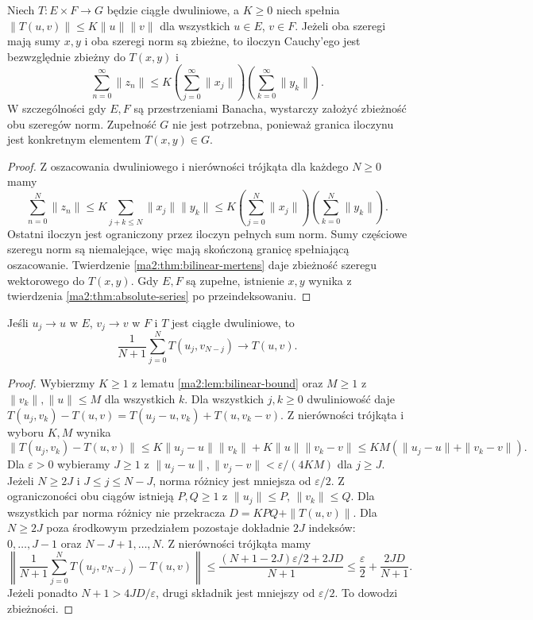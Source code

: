 \begin{wniosek}
\label{ma2:cor:bilinear-absolute}
Niech $T:E\times F\to G$ będzie ciągłe dwuliniowe,
a $K\ge0$ niech spełnia $\|T(u,v)\|\le K\|u\|\|v\|$
dla wszystkich $u\in E$, $v\in F$. Jeżeli oba szeregi
mają sumy $x,y$ i oba szeregi norm są zbieżne, to iloczyn Cauchy'ego
jest bezwzględnie zbieżny do $T(x,y)$ i
\[
 \sum_{n=0}^{\infty}\|z_n\|
 \le K\left(\sum_{j=0}^\infty\|x_j\|\right)
      \left(\sum_{k=0}^\infty\|y_k\|\right).
\]
W szczególności gdy $E,F$ są przestrzeniami Banacha,
wystarczy założyć zbieżność obu szeregów norm.
Zupełność $G$ nie jest potrzebna, ponieważ granica
iloczynu jest konkretnym elementem $T(x,y)\in G$.
\end{wniosek}
\begin{proof}
Z oszacowania dwuliniowego i nierówności trójkąta
dla każdego $N\ge0$ mamy
\[
 \sum_{n=0}^N\|z_n\|
 \le K\sum_{j+k\le N}\|x_j\|\|y_k\|
 \le K\left(\sum_{j=0}^N\|x_j\|\right)
      \left(\sum_{k=0}^N\|y_k\|\right).
\]
Ostatni iloczyn jest ograniczony przez iloczyn pełnych
sum norm. Sumy częściowe szeregu norm są niemalejące,
więc mają skończoną granicę spełniającą oszacowanie.
Twierdzenie \ref{ma2:thm:bilinear-mertens} daje
zbieżność szeregu wektorowego do $T(x,y)$.
Gdy $E,F$ są zupełne, istnienie $x,y$ wynika
z twierdzenia \ref{ma2:thm:absolute-series} po przeindeksowaniu.
\end{proof}

\begin{lemat}
\label{ma2:lem:bilinear-diagonal-means}
Jeśli $u_j\to u$ w $E$, $v_j\to v$ w $F$ i $T$ jest
ciągłe dwuliniowe, to
\[
 \frac1{N+1}\sum_{j=0}^N T(u_j,v_{N-j})\longrightarrow T(u,v).
\]
\end{lemat}
\begin{proof}
Wybierzmy $K\ge1$ z lematu \ref{ma2:lem:bilinear-bound}
oraz $M\ge1$ z $\|v_k\|,\|u\|\le M$ dla wszystkich $k$.
Dla wszystkich $j,k\ge0$ dwuliniowość daje
$T(u_j,v_k)-T(u,v)=T(u_j-u,v_k)+T(u,v_k-v)$.
Z nierówności trójkąta i wyboru $K,M$ wynika
\[
 \|T(u_j,v_k)-T(u,v)\|
 \le K\|u_j-u\|\|v_k\|+K\|u\|\|v_k-v\|
 \le KM(\|u_j-u\|+\|v_k-v\|).
\]
Dla $\varepsilon>0$ wybieramy $J\ge1$ z
$\|u_j-u\|,\|v_j-v\|<\varepsilon/(4KM)$ dla $j\ge J$.
Jeżeli $N\ge2J$ i $J\le j\le N-J$, norma różnicy
jest mniejsza od $\varepsilon/2$.
Z ograniczoności obu ciągów istnieją $P,Q\ge1$
z $\|u_j\|\le P$, $\|v_k\|\le Q$. Dla wszystkich par
norma różnicy nie przekracza $D=KPQ+\|T(u,v)\|$.
Dla $N\ge2J$ poza środkowym przedziałem pozostaje
dokładnie $2J$ indeksów: $0,\ldots,J-1$ oraz
$N-J+1,\ldots,N$. Z nierówności trójkąta mamy
\[
 \left\|\frac1{N+1}\sum_{j=0}^N T(u_j,v_{N-j})-T(u,v)\right\|
 \le\frac{(N+1-2J)\varepsilon/2+2JD}{N+1}
 \le\frac{\varepsilon}{2}+\frac{2JD}{N+1}.
\]
Jeżeli ponadto $N+1>4JD/\varepsilon$, drugi składnik
jest mniejszy od $\varepsilon/2$. To dowodzi zbieżności.
\end{proof}

